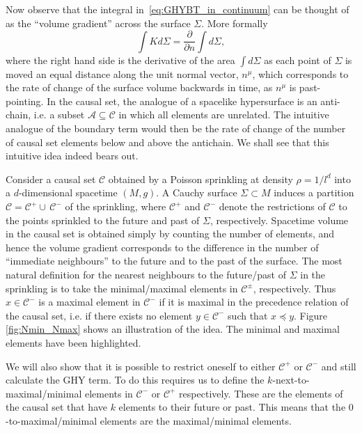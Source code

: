 \documentclass[12pt]{article}
\newcommand{\be}{\begin{equation}}
\newcommand{\ee}{\end{equation}}
\newcommand{\mb}[1]{\marginnote{\texttt{\small MB:\,#1}}}
\begin{document}
Now observe that the integral in~\eqref{eq:GHYBT_in_continuum} can be thought of as the ``volume gradient'' across the surface $\Sigma$. More formally
\be
\int K d\Sigma = \frac{\partial}{\partial n}\int d\Sigma,
\ee
where the right hand side is the derivative of the area $\int d\Sigma$ as each point of $\Sigma$ is moved an equal distance along the unit normal vector, $n^{\mu}$, which corresponds to the rate of change of the surface volume backwards in time, as $n^{\mu}$ is past-pointing. 
\mb{does the antichain analogy really stand?} 
In the causal set, the analogue of a spacelike hypersurface is an anti-chain, i.e. a subset $\mathcal{A}\subseteq\mathcal{C}$ in which all elements are unrelated. The intuitive analogue of the boundary term would then be the rate of change of the number of causal set elements below and above the antichain. We shall see that this intuitive idea indeed bears out. %

Consider a causal set $\mathcal C$ obtained by a Poisson sprinkling at density $\rho=1/l^d$ into a $d$-dimensional spacetime $(M,g)$. A Cauchy surface $\Sigma\subset M$ induces a partition $\mathcal C = \mathcal C^+ \cup\, \mathcal C^-$ of the sprinkling, where $\mathcal C^+$ and $\mathcal C^-$ denote the restrictions of $\mathcal C$ to the points sprinkled to the future and past of $\Sigma$, respectively. Spacetime volume in the causal set is obtained simply by counting the number of elements, and hence the volume gradient corresponds to the difference in the number of ``immediate neighbours'' to the future and to the past of the surface. The most natural definition for the nearest neighbours to the future/past of $\Sigma$ in the sprinkling is to take the minimal/maximal elements in $\mathcal C^\pm$, respectively. Thus $x\in \mathcal C^-$ is a maximal element in $\mathcal C^-$ if it is maximal in the precedence relation of the causal set, i.e. if there exists no element $y\in\mathcal C^-$ such that $x\preceq y$. Figure \ref{fig:Nmin_Nmax} shows an illustration of the idea. The minimal and maximal elements have been highlighted. 

We will also show that it is possible to restrict oneself to either $\mathcal C^+$ or $\mathcal C^-$ and still calculate the GHY term. To do this requires us to define the $k$-next-to-maximal/minimal elements in $\mathcal C^-$ or $\mathcal C^+$ respectively. These are the elements of the causal set that have $k$ elements to their future or past. This means that the $0$-to-maximal/minimal elements are the maximal/minimal elements. 
\end{document}

